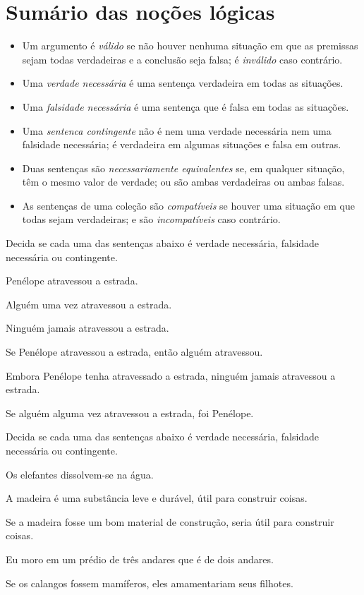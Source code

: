 \section*{Sumário das noções lógicas}

\begin{itemize}
\item Um argumento é \textit{válido} se não houver nenhuma situação em que as premissas sejam todas verdadeiras e a conclusão seja falsa; é \textit{inválido} caso contrário.

\item Uma \textit{verdade necessária} é uma sentença verdadeira em todas as situações.

\item Uma \textit{falsidade necessária} é uma sentença que é falsa em todas as situações.

\item Uma \textit{sentenca contingente} não é nem uma verdade necessária nem uma falsidade necessária; é verdadeira em algumas situações e falsa em outras.

\item Duas sentenças são \textit{necessariamente equivalentes} se, em qualquer situação, têm o mesmo valor de verdade; ou são ambas verdadeiras ou ambas falsas.

\item As sentenças de uma coleção são \textit{compatíveis} se houver uma situação em que todas sejam verdadeiras; e são \textit{incompatíveis} caso contrário.
\end{itemize}


\practiceproblems
\problempart
\label{pr.EnglishTautology2}
Decida se cada uma das sentenças abaixo é verdade necessária, falsidade necessária ou contingente.
\begin{earg}
\item Penélope atravessou a estrada.
\item Alguém uma vez atravessou a estrada.
\item Ninguém jamais atravessou a estrada.
\item Se Penélope atravessou a estrada, então alguém atravessou.
\item Embora Penélope tenha atravessado a estrada, ninguém jamais atravessou a estrada.
\item Se alguém alguma vez atravessou a estrada, foi Penélope.
\end{earg}

\problempart
Decida se cada uma das sentenças abaixo é verdade necessária, falsidade necessária ou contingente.
\begin{earg}
\item Os elefantes dissolvem-se na água.
\item A madeira é uma substância leve e durável, útil para construir coisas.
\item Se a madeira fosse um bom material de construção, seria útil para construir coisas.
\item Eu moro em um prédio de três andares que é de dois andares.
\item Se os calangos fossem mamíferos, eles amamentariam seus filhotes.
\end{earg}

